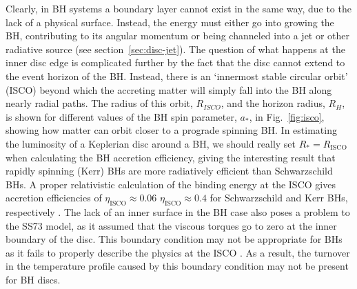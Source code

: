Clearly, in BH systems a boundary layer cannot exist in the same way,
due to the lack of a physical surface. Instead, the energy must either go into
growing the BH, contributing to its angular momentum or being
channeled into a jet or other radiative source (see section~\ref{sec:disc-jet}).
The question of what happens at the inner disc edge
is complicated further by the fact that the disc cannot extend to the 
event horizon of the BH. Instead, there is an `innermost stable circular orbit' (ISCO)
beyond which the accreting matter will simply fall 
into the BH along nearly radial paths. The radius
of this orbit, $R_{ISCO}$, and the horizon radius, $R_H$,
is shown for different values of the BH spin parameter, $a_*$, 
in Fig.~\ref{fig:isco}, showing how matter can orbit closer to a prograde spinning BH. 
In estimating the luminosity of a Keplerian disc around a BH, 
we should really set $R_*=R_{\mathrm{ISCO}}$ when calculating the BH accretion efficiency,
giving the interesting result that rapidly spinning (Kerr) BHs
are more radiatively efficient than Schwarzschild BHs. A proper relativistic
calculation of the binding energy at the ISCO gives accretion efficiencies of 
$\eta_{\mathrm{ISCO}}\approx0.06$ $\eta_{\mathrm{ISCO}}\approx0.4$ for Schwarzschild
and Kerr BHs, respectively \citep[e.g.][]{thorne1974}. The lack of an inner surface in the
BH case also poses a problem to the SS73 model, as it assumed that the viscous torques
go to zero at the inner boundary of the disc. This boundary condition
may not be appropriate for BHs as it fails to properly describe the physics at the ISCO
\citep[e.g.][]{abramowicz}. As a result, the turnover in the temperature profile
caused by this boundary condition may not be present for BH discs.

